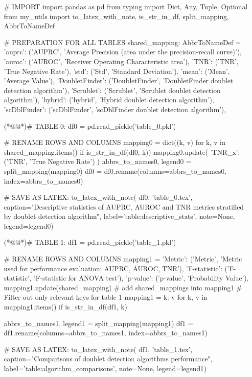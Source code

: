 \documentclass[11pt]{article}
\begin{document}
\begin{python}

# IMPORT
import pandas as pd
from typing import Dict, Any, Tuple, Optional
from my_utils import to_latex_with_note, is_str_in_df, split_mapping, AbbrToNameDef

# PREPARATION FOR ALL TABLES
shared_mapping: AbbrToNameDef = {
    'auprc': ('AUPRC', 'Average Precision (area under the precision-recall curve)'),
    'auroc': ('AUROC', 'Receiver Operating Characteristic area'),
    'TNR': ('TNR', 'True Negative Rate'),
    'std': ('Std', 'Standard Deviation'),
    'mean': ('Mean', 'Average Value'),
    'DoubletFinder': ('DoubletFinder', 'DoubletFinder doublet detection algorithm'),
    'Scrublet': ('Scrublet', 'Scrublet doublet detection algorithm'),
    'hybrid': ('hybrid', 'Hybrid doublet detection algorithm'),
    'scDblFinder': ('scDblFinder', 'scDblFinder doublet detection algorithm'),
}

(*@@*)# TABLE 0:
df0 = pd.read_pickle('table_0.pkl')

# RENAME ROWS AND COLUMNS
mapping0 = dict((k, v) for k, v in shared_mapping.items() if is_str_in_df(df0, k))
mapping0.update({
    'TNR_x': ('TNR', 'True Negative Rate')
})
abbrs_to_names0, legend0 = split_mapping(mapping0)
df0 = df0.rename(columns=abbrs_to_names0, index=abbrs_to_names0)

# SAVE AS LATEX:
to_latex_with_note(
    df0, 'table_0.tex',
    caption="Descriptive statistics of AUPRC, AUROC and TNR metrics stratified by doublet detection algorithm",
    label='table:descriptive_stats',
    note=None,
    legend=legend0)

(*@@*)# TABLE 1:
df1 = pd.read_pickle('table_1.pkl')

# RENAME ROWS AND COLUMNS
mapping1 = {
    'Metric': ('Metric', 'Metric used for performance evaluation: AUPRC, AUROC, TNR'),
    'F-statistic': ('F-statistic', 'F-statistic for ANOVA test'),
    'p-value': ('p-value', 'Probability Value'),
}
mapping1.update(shared_mapping)  # add shared_mappings into mapping1
# Filter out only relevant keys for table 1
mapping1 = {k: v for k, v in mapping1.items() if is_str_in_df(df1, k)}

abbrs_to_names1, legend1 = split_mapping(mapping1)
df1 = df1.rename(columns=abbrs_to_names1, index=abbrs_to_names1)

# SAVE AS LATEX:
to_latex_with_note(
    df1, 'table_1.tex',
    caption="Comparisons of doublet detection algorithms performance",
    label='table:algorithm_comparisons',
    note=None,
    legend=legend1)


\end{python}
\end{document}
